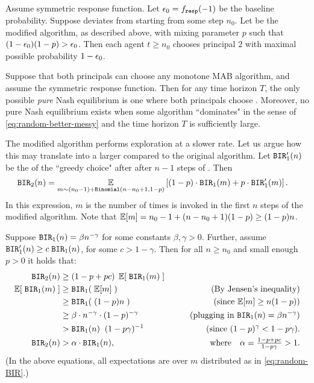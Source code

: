 \begin{theorem}\label{thm:random-greedy}
Assume symmetric \HardMaxRandom response function. Let $\epsilon_0 = f_{\mathtt{resp}}(-1)$ be the baseline probability. Suppose \alg[1] deviates from \DynGreedy starting from some step $n_0$. Let \alg[2] be the modified algorithm, as described above, with mixing parameter $p$ such that
    $(1-\epsilon_0)(1-p)>\epsilon_0$.
Then each agent $t\geq n_0$ chooses principal $2$ with maximal possible probability $1-\epsilon_0$.
\end{theorem}

\begin{corollary}\label{cor:random-greedy}
  Suppose that both principals can choose any monotone MAB algorithm, and assume the symmetric \HardMaxRandom response
  function. Then for any time
  horizon $T$, the only possible \emph{pure} Nash equilibrium is one
  where both principals choose \DynGreedy. Moreover, no pure Nash
  equilibrium exists when some algorithm ``dominates" \DynGreedy in
  the sense of \eqref{eq:random-better-messy} and the time horizon $T$
  is sufficiently large.
\end{corollary}


\begin{remark}
The modified algorithm performs exploration %
at a slower rate. Let us argue how this may translate  into a larger \BIR compared to the original algorithm. Let  $\mathtt{BIR}'_1(n)$ be the \BIR of the ``greedy choice" after after $n-1$ steps of \alg[1]. Then
\begin{align}\label{eq:random-BIR}
\mathtt{BIR}_2(n)
    &= \operatorname*{\mathbb{E}}_{m\sim (n_0-1)+\mathtt{Binomial}(n-n_0+1,1-p)}\left[(1-p) \cdot \mathtt{BIR}_1(m) + p \cdot \mathtt{BIR}'_1(m)\right].
\end{align}
In this expression, $m$ is the number of times \alg[1] is invoked in the first $n$ steps of the modified algorithm. Note that
    $\E[m] = n_0-1 + (n-n_0+1)(1-p) \geq (1-p)n$.

Suppose $\mathtt{BIR}_1(n)= \beta n^{-\gamma}$ for some constants $\beta,\gamma>0$. Further, assume 
    $\mathtt{BIR}'_1(n)\geq  c\; \mathtt{BIR}_1(n)$,
for some $c>1-\gamma$.
Then for all $n\geq n_0$ and small enough $p>0$ it holds that:
\begin{align*}
 \BIR_2(n) 
    &\geq  (1-p+pc)\; \E[\; \BIR_1(m) \;] \\
\E[\; \BIR_1(m) \;]
    &\geq \BIR_1(\; \E[m] \;) &\qquad\text{(By Jensen's inequality)} \\
    &\geq \BIR_1(\; (1-p)n \;) &\qquad\text{(since $\E[m]\geq n(1-p)$)}  \\
    &\geq \beta\cdot n^{-\gamma} \cdot (1-p)^{-\gamma} 
        &\qquad\text{(plugging in $\BIR_1(n)=\beta n^{-\gamma}$)}  \\
    &> \BIR_1(n)\;\; (1-p\gamma)^{-1}
        &\qquad\text{(since $(1-p)^\gamma < 1-p\gamma$)}.\\
\BIR_2(n) 
    &>\alpha\cdot \BIR_1(n),
    &\text{where} \quad 
    \alpha = \tfrac{1-p+pc}{1-p\gamma}>1.
\end{align*}
(In the above equations, all expectations are over $m$ distributed as in \eqref{eq:random-BIR}.)
\end{remark}



